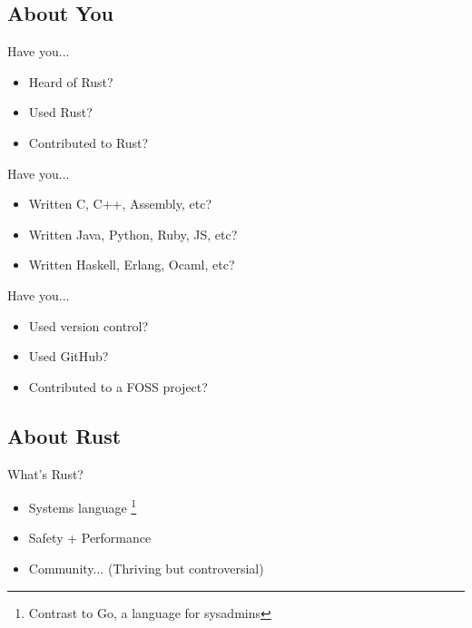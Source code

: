 \documentclass[xcolor={svgnames},hyperref]{beamer}
\begin{document}
    \subsection{About You}

    \begin{frame}
        Have you...
        \begin{itemize}
            \item Heard of Rust?
            \item Used Rust?
            \item Contributed to Rust?
        \end{itemize}
    \end{frame}

    \begin{frame}
        Have you...
        \begin{itemize}
            \item Written C, C++, Assembly, etc?
            \item Written Java, Python, Ruby, JS, etc?
            \item Written Haskell, Erlang, Ocaml, etc?
        \end{itemize}
    \end{frame}

    \begin{frame}
        Have you...
        \begin{itemize}
            \item Used version control?
            \item Used GitHub?
            \item Contributed to a FOSS project?
        \end{itemize}
    \end{frame}

    \subsection{About Rust}

    \begin{frame}
        What's Rust?
        \begin{itemize}
            \item Systems language \footnote{Contrast to Go, a language for sysadmins}
            \item Safety + Performance
            \item Community... (Thriving but controversial)
        \end{itemize}
    \end{frame}
\end{document}
